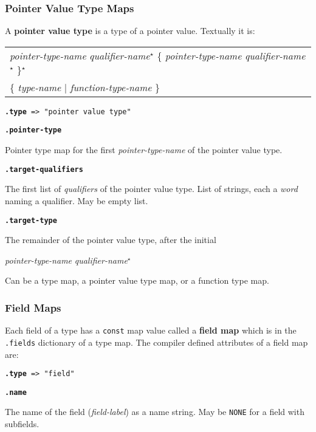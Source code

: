 \documentclass[12pt]{article}
\newcommand{\STAR}{{\Large $^\star$}}
\newcommand{\key}[1]{{\rm \bfseries #1}}
\newcommand{\ttkey}[1]{{\tt \bfseries #1}}
\newenvironment{indpar}[1][0.3in]%
	{\begin{list}{}%
		     {\setlength{\itemsep}{0in}%
		      \setlength{\topsep}{0in}%
		      \setlength{\parsep}{1ex}%
		      \setlength{\labelwidth}{#1}%
		      \setlength{\leftmargin}{#1}%
		      \addtolength{\leftmargin}{\labelsep}}%
	 \item}%
	{\end{list}}
\begin{document}
\subsubsection{Pointer Value Type Maps}
\label{POINTER-VALUE-TYPE-MAPS}

A \key{pointer value type} is a type of a pointer value.
Textually it is:
\begin{center}
\begin{tabular}{l}
{\em pointer-type-name} {\em qualifier-name}\STAR{}
\{ {\em pointer-type-name} {\em qualifier-name}\STAR{} \}\STAR{} \\
\hspace*{0.5in}\{ {\em type-name} $|$ {\em function-type-name} \} \\
\end{tabular}
\end{center}

{\tt \ttkey{.type} => "pointer value type"}

\ttkey{.pointer-type}
\begin{indpar}
Pointer type map for the first {\em pointer-type-name}
of the pointer value type.
\end{indpar}

\ttkey{.target-qualifiers}
\begin{indpar}
The first list of {\em qualifiers} of the pointer value type.
List of strings, each a {\em word} naming a qualifier.
May be empty list.
\end{indpar}

\ttkey{.target-type}
\begin{indpar}
The remainder of the pointer value type, after the initial
\begin{center}
{\em pointer-type-name} {\em qualifier-name}\STAR{}
\end{center}
Can be a type map, a pointer value type map, or a function type map.
\end{indpar}

\subsubsection{Field Maps}
\label{FIELD-MAPS}

Each field of a type has a {\tt const} map value called
a \key{field map} which is in the {\tt .fields} dictionary of
a type map.  The compiler defined attributes of a field map are:

{\tt \ttkey{.type} => "field"}

\ttkey{.name}
\begin{indpar}
The name of the field ({\em field-label})
as a name string.  May be {\tt NONE} for a field with subfields.
\end{indpar}
\end{document}
